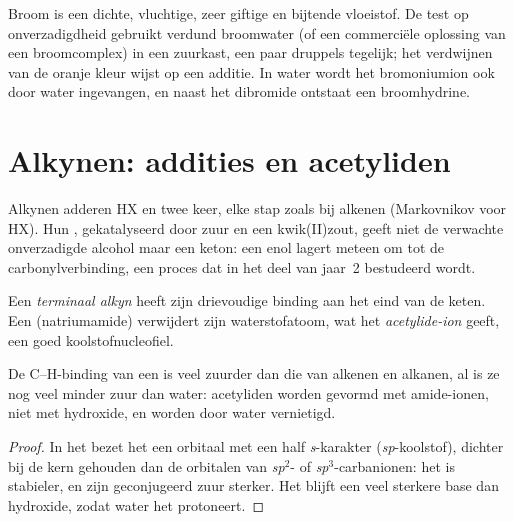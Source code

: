 \begin{inthelab}[Broomwater]
Broom is een dichte, vluchtige, zeer giftige en bijtende vloeistof. De
test op onverzadigdheid gebruikt verdund broomwater (of een commerciële
oplossing van een broomcomplex) in een zuurkast, een paar druppels
tegelijk; het verdwijnen van de oranje kleur wijst op een additie. In
water wordt het bromoniumion ook door water ingevangen, en naast het
dibromide ontstaat een broomhydrine.
\end{inthelab}

\section{Alkynen: addities en acetyliden}

Alkynen adderen HX en  twee keer, elke stap zoals bij alkenen
(Markovnikov voor HX). Hun , gekatalyseerd door zuur en een
kwik(II)zout, geeft niet de verwachte onverzadigde alcohol maar een keton:
een enol lagert meteen om tot de carbonylverbinding, een proces dat in
het deel van jaar~2 bestudeerd wordt.

\begin{definition}\label{def:b1:electrophilic-additions:acetylide}
Een \emph{terminaal alkyn}  heeft zijn
drievoudige binding aan het eind van de keten. Een 
(natriumamide) verwijdert zijn waterstofatoom, wat het
\emph{acetylide-ion}  geeft, een goed
koolstofnucleofiel.
\end{definition}

\begin{proposition}\label{prop:b1:electrophilic-additions:acetylide-acidity}
De C--H-binding van een  is veel zuurder dan die van
alkenen en alkanen, al is ze nog veel minder zuur dan water: acetyliden
worden gevormd met amide-ionen, niet met hydroxide, en worden door water
vernietigd.
\end{proposition}

\begin{proof}
In het  bezet het  een orbitaal met een half
\textit{s}-karakter (\textit{sp}-koolstof), dichter bij de kern gehouden
dan de orbitalen van \textit{sp}$^2$- of \textit{sp}$^3$-carbanionen: het
is stabieler, en zijn geconjugeerd zuur sterker. Het blijft een veel
sterkere base dan hydroxide, zodat water het protoneert.
\end{proof}

